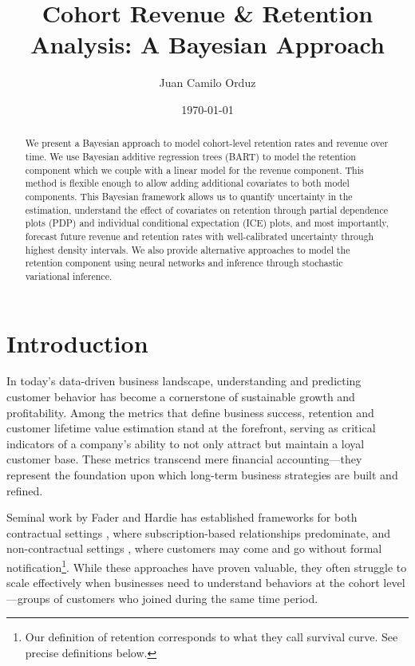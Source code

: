 \documentclass[11pt]{amsart}
\theoremstyle{definition}
\begin{document}
\title{Cohort Revenue \& Retention Analysis: A Bayesian Approach}
\author{Juan Camilo Orduz}
\address{Berlin, Germany}
\date{\today}

\begin{abstract}
    We present a Bayesian approach to model cohort-level retention rates and revenue over time. We use Bayesian additive
    regression trees (BART) to model the retention component which we couple with a linear model for the revenue component.
    This method is flexible enough to allow adding additional covariates to both model components. This Bayesian framework
    allows us to quantify uncertainty in the estimation, understand the effect of covariates on retention through partial
    dependence plots (PDP) and individual conditional expectation (ICE) plots, and most importantly, forecast future
    revenue and retention rates with well-calibrated uncertainty through highest density intervals. We also provide
    alternative approaches to model the retention component using neural networks and inference through stochastic variational
    inference.
\end{abstract}

\maketitle

\tableofcontents
{}

\section{Introduction}

In today's data-driven business landscape, understanding and predicting customer behavior has become a cornerstone of
sustainable growth and profitability. Among the metrics that define business success, retention and customer lifetime value
estimation stand at the forefront, serving as critical indicators of a company's ability to not only attract but maintain a
loyal customer base. These metrics transcend mere financial accounting—they represent the foundation upon which long-term
business strategies are built and refined.

Seminal work by Fader and Hardie has established frameworks for both contractual settings \cite{FaderHardie2007}, where
subscription-based relationships predominate, and non-contractual settings \cite{FaderHardie2005}, where customers may come
and go without formal notification\footnote{Our definition of retention corresponds to what they call survival curve. See
    precise definitions below.}. While these approaches have proven valuable, they often struggle to scale effectively when
businesses need to understand behaviors at the cohort level—groups of customers who joined during the same time period.
\end{document}
